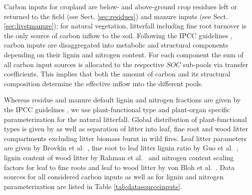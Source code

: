 \documentclass[gc, manuscript]{copernicus}
\begin{document}
Carbon inputs for cropland are below- and above-ground crop residues left or returned to the field (see Sect. \ref{sec:residues}) and manure inputs (see Sect. \ref{sec:livstmanure}); for natural vegetation, litterfall including fine root turnover \citep{schaphoff_lpjml4_2018} is the only source of carbon inflow to the soil. Following the IPCC guidelines \citep{ogle_cropland_in_ipcc_2019}, carbon inputs are disaggregated into metabolic and structural components depending on their lignin and nitrogen content. For each component the sum of all carbon input sources is allocated to the respective \(SOC\) sub-pools via transfer coefficients. This implies that both the amount of carbon and its structural composition determine the effective inflow into the different pools.

Whereas residue and manure default lignin and nitrogen fractions are given by the IPCC guidelines \citep{ogle_cropland_in_ipcc_2019}, we use plant-functional type and plant-organ specific parameterization for the natural litterfall. Global distribution of plant-functional types is given by \citep{schaphoff_lpjml4_2018} as well as separation of litter into leaf, fine root and wood litter compartments excluding litter biomass burnt in wild fires. Leaf litter parameters are given by Brovkin et al.~\citeyearpar{brovkin_plant-driven_2012}, fine root to leaf litter lignin ratio by Guo et al.~\citeyearpar{guo_leaf_root_decompostion_2021}, lignin content of wood litter by Rahman et al.~\citeyearpar{rahman_lignin_2013} and nitrogen content scaling factors for leaf to fine roots and leaf to wood litter by von Bloh et al.~\citeyearpar{vBloh_lpjml5_2018}.
Data sources for all considered carbon inputs as well as for lignin and nitrogen parameterization are listed in Table \ref{tab:datasourceinputs}.
\end{document}
